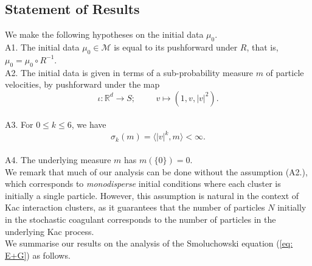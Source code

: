 \documentclass[11pt, notitlepage]{article}
\begin{document}
\subsection{\textbf{Statement of Results}}\label{sec: results}

We make the following hypotheses on the initial data $\mu_0$.
\\A1. The initial data $\mu_0 \in \mathcal{M}$ is equal to its pushforward under $R$, that is, $\mu_0 = \mu_0 \circ R^{-1}$.
\\ A2. The initial data is given in terms of a sub-probability measure $m$ of particle velocities, by pushforward under the map
\begin{equation}
    \iota: \mathbb{R}^d \rightarrow S; \hspace{1cm} v\mapsto (1, v, |v|^2).
\end{equation}
\\ {A3.} For $0\leq k\leq 6$, we have
\begin{equation}
    \sigma_k(m)=\langle |v|^k, m\rangle <\infty.
\end{equation} 
\\ {A4.} The underlying measure $m$ has $m(\{0\})=0.$
\\We remark that much of our analysis can be done without the assumption (A2.), which corresponds to \emph{monodisperse} initial conditions where each cluster is initially a single particle. However, this assumption is natural in the context of Kac interaction clusters, as it guarantees that the number of particles $N$ initially in the stochastic coagulant corresponds to the number of particles in the underlying Kac process. 
\\ We summarise our results on the analysis of the Smoluchowski equation (\ref{eq: E+G}) as follows.
\end{document}
